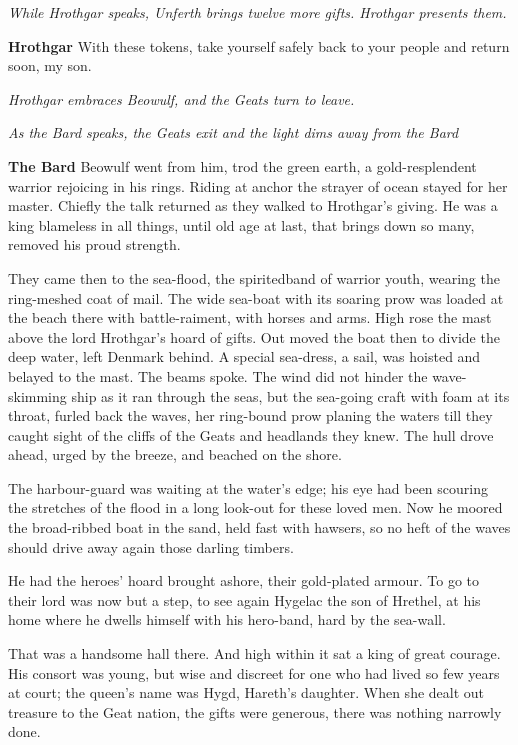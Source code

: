 \documentclass[a4paper]{article}
\begin{document}
{\centerline{\textit{While Hrothgar speaks, Unferth brings twelve more gifts. Hrothgar presents them.}}

\textbf{Hrothgar} With these tokens,
take yourself safely back to your people
and return soon, my son.

\centerline{\textit{Hrothgar embraces Beowulf, and the Geats turn to leave.}}
\centerline{\textit{As the Bard speaks, the Geats exit and the light dims away from the Bard}}

\textbf{The Bard}  Beowulf went from him,
trod the green earth, a gold-resplendent warrior
rejoicing in his rings. Riding at anchor
the strayer of ocean stayed for her master.
Chiefly the talk returned as they walked
to Hrothgar’s giving. He was a king
blameless in all things, until old age at last,
that brings down so many, removed his proud strength.

They came then to the sea-flood, the spiritedband
of warrior youth, wearing the ring-meshed
coat of mail.
The wide sea-boat with its soaring prow
was loaded at the beach there with battle-raiment,
with horses and arms. High rose the mast
above the lord Hrothgar’s hoard of gifts.
Out moved the boat then
to divide the deep water, left Denmark behind.
A special sea-dress, a sail, was hoisted
and belayed to the mast. The beams spoke.
The wind did not hinder the wave-skimming ship
as it ran through the seas, but the sea-going craft
with foam at its throat, furled back the waves,
her ring-bound prow planing the waters
till they caught sight of the cliffs of the Geats
and headlands they knew. The hull drove ahead,
urged by the breeze, and beached on the shore.

The harbour-guard was waiting at the water’s edge;
his eye had been scouring the stretches of the flood
in a long look-out for these loved men.
Now he moored the broad-ribbed boat in the sand,
held fast with hawsers, so no heft of the waves
should drive away again those darling timbers.

He had the heroes’ hoard brought ashore,
their gold-plated armour. To go to their lord
was now but a step, to see again Hygelac
the son of Hrethel, at his home where he dwells
himself with his hero-band, hard by the sea-wall.

That was a handsome hall there. And high within it sat
a king of great courage. His consort was young,
but wise and discreet for one who had lived
so few years at court; the queen’s name was Hygd,
Hareth’s daughter. When she dealt out treasure
to the Geat nation, the gifts were generous,
there was nothing narrowly done.

}
\end{document}
